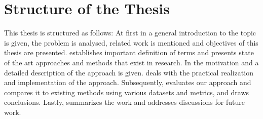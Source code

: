 \section{Structure of the Thesis}
\label{sec:structure_of_thesis}

This thesis is structured as follows:
At first in \textbf{} a general introduction to the topic is given, the problem is analysed, related work is mentioned and objectives of this thesis are presented.
\textbf{} establishes important definition of terms and presents state of the art approaches and methods that exist in research.
In \textbf{} the motivation and a detailed description of the approach is given.
\textbf{} deals with the practical realization and implementation of the approach.
Subsequently, \textbf{} evaluates our approach and compares it to existing methods using various datasets and metrics, and draws conclusions.
Lastly, \textbf{} summarizes the work and addresses discussions for future work.